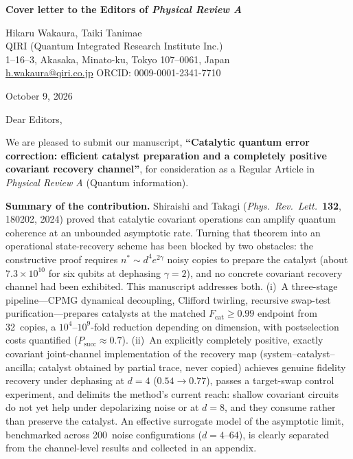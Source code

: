 \documentclass[11pt,a4paper]{article}
\begin{document}
\textbf{Cover letter to the Editors of \emph{Physical Review A}}

\vspace{0.4cm}

Hikaru Wakaura, Taiki Tanimae \\
QIRI (Quantum Integrated Research Institute Inc.)\\
1--16--3, Akasaka, Minato-ku, Tokyo 107--0061, Japan\\
\href{mailto:h.wakaura@qiri.co.jp}{h.wakaura@qiri.co.jp} \quad ORCID: 0009-0001-2341-7710

\vspace{0.3cm}
October 9, 2026

\vspace{0.4cm}

Dear Editors,

\medskip

We are pleased to submit our manuscript, \textbf{``Catalytic quantum error correction: efficient catalyst preparation and a completely positive covariant recovery channel''}, for consideration as a Regular Article in \emph{Physical Review A} (Quantum information).

\medskip

\textbf{Summary of the contribution.}
Shiraishi and Takagi (\emph{Phys.\ Rev.\ Lett.}\ \textbf{132}, 180202, 2024) proved that catalytic covariant operations can amplify quantum coherence at an unbounded asymptotic rate.
Turning that theorem into an operational state-recovery scheme has been blocked by two obstacles: the constructive proof requires $n^{*} \sim d^{4} e^{2\gamma}$ noisy copies to prepare the catalyst (about $7.3 \times 10^{10}$ for six qubits at dephasing $\gamma = 2$), and no concrete covariant recovery channel had been exhibited.
This manuscript addresses both.
(i)~A three-stage pipeline---CPMG dynamical decoupling, Clifford twirling, recursive swap-test purification---prepares catalysts at the matched $F_\mathrm{cat} \geq 0.99$ endpoint from 32~copies, a $10^{4}$--$10^{9}$-fold reduction depending on dimension, with postselection costs quantified ($P_\mathrm{succ} \approx 0.7$).
(ii)~An explicitly completely positive, exactly covariant joint-channel implementation of the recovery map (system--catalyst--ancilla; catalyst obtained by partial trace, never copied) achieves genuine fidelity recovery under dephasing at $d = 4$ ($0.54 \to 0.77$), passes a target-swap control experiment, and delimits the method's current reach: shallow covariant circuits do not yet help under depolarizing noise or at $d = 8$, and they consume rather than preserve the catalyst.
An effective surrogate model of the asymptotic limit, benchmarked across 200~noise configurations ($d = 4$--$64$), is clearly separated from the channel-level results and collected in an appendix.
\end{document}
